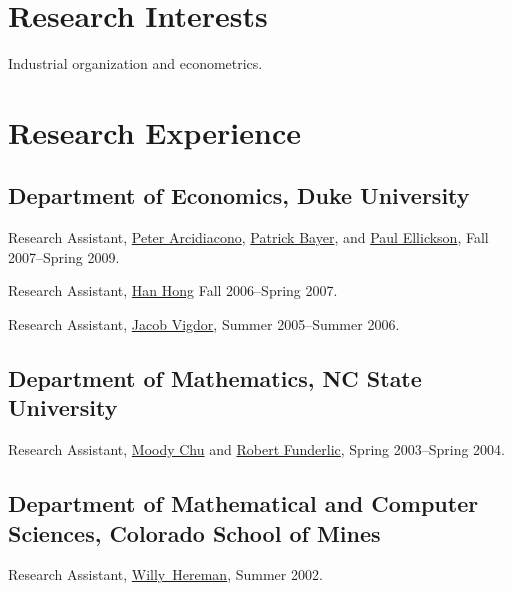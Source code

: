 \documentclass[11pt,letterpaper]{article}
\renewenvironment{itemize}{
  \begin{list}{}
    { \setlength{\itemsep}{5pt}
      \setlength{\parsep}{0pt}
      \setlength{\topsep}{0pt}
      \setlength{\leftmargin}{0em} } }{
  \end{list}}
\begin{document}
\section*{Research Interests}

Industrial organization and econometrics.


\section*{Research Experience}

\subsection*{Department of Economics, Duke University}

\begin{itemize}
\item Research Assistant,
  \href{http://www.econ.duke.edu/~psarcidi/}{Peter Arcidiacono},
  \href{http://www.econ.duke.edu/~pb29/}{Patrick Bayer}, and
  \href{http://www.econ.duke.edu/~paule/}{Paul Ellickson},
  Fall 2007--Spring 2009.
\item Research Assistant,
  \href{http://www.stanford.edu/~doubleh/}{Han Hong}  
  Fall 2006--Spring 2007.
\item Research Assistant,
  \href{http://trinity.aas.duke.edu/~jvigdor/}{Jacob Vigdor},
  Summer 2005--Summer 2006.
\end{itemize}

\subsection*{Department of Mathematics, NC State University}

\begin{itemize}
\item Research Assistant,
  \href{http://www4.ncsu.edu/~mtchu/}{Moody Chu} and
  \href{http://www4.ncsu.edu/~ref/}{Robert Funderlic},
  Spring 2003--Spring 2004.
\end{itemize}

\subsection*{Department of Mathematical and Computer Sciences,
  Colorado School of Mines}

\begin{itemize}
\item Research Assistant,
  \href{http://www.mines.edu/fs_home/whereman/}{Willy\ Hereman},
  Summer 2002.
\end{itemize}
\end{document}
